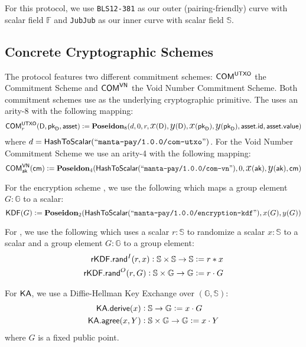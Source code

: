 For this protocol, we use \texttt{BLS12-381} as our outer (pairing-friendly) curve with scalar field $\mathbb{F}$ and \texttt{JubJub} as our inner curve with scalar field $\mathbb{S}$.

\subsection{Concrete Cryptographic Schemes}

\begin{definition}
    The protocol features two different commitment schemes: ${\textsf{COM}}^{{\textsf{UTXO}}}$ the \UTXO{} Commitment Scheme and ${\textsf{COM}}^{{\textsf{VN}}}$ the Void Number Commitment Scheme. Both commitment schemes use \Poseidon{} as the underlying cryptographic primitive. The \UTXO{} uses an arity-8 \Poseidon{} with the following mapping:
    \[{\textsf{COM}}^{{\textsf{UTXO}}}_r(\textsf{D}, {{\textsf{pk}}_\textsf{D}}, {\textsf{asset}}) := {\textbf{Poseidon}}_8(d, 0, r, {\text{\Large $x$}}(\textsf{D}), {\text{\Large $y$}}(\textsf{D}), {\text{\Large $x$}}({{\textsf{pk}}_\textsf{D}}), {\text{\Large $y$}}({{\textsf{pk}}_\textsf{D}}), {\textsf{asset}}.{\textsf{id}}, {\textsf{asset}}.{\textsf{value}})\]
    where $d = {\textsf{HashToScalar}}({``\texttt{manta-pay/1.0.0/com-utxo}"})$.
    For the Void Number Commitment Scheme we use an arity-4 \Poseidon{} with the following mapping:
    \[{\textsf{COM}}^{{\textsf{VN}}}_{\textsf{ak}}({\textsf{cm}}) := {\textbf{Poseidon}}_4({\textsf{HashToScalar}}({``\texttt{manta-pay/1.0.0/com-vn}"}), 0, {\text{\Large $x$}}({\textsf{ak}}), {\text{\Large $y$}}({\textsf{ak}}), {\textsf{cm}})\]
\end{definition}

\begin{definition}
    For the encryption scheme , we use the following which maps a group element $G : \mathbb{G}$ to a scalar:
    \[{\textsf{KDF}}(G) := {\textbf{Poseidon}}_2({\textsf{HashToScalar}}({``\texttt{manta-pay/1.0.0/encryption-kdf}"}), x(G), y(G))\]
\end{definition}

\begin{definition}
    For \rKDF, we use the following which uses a scalar $r: \mathbb{S}$ to randomize a scalar $x: \mathbb{S}$ to a scalar 
    and a group element $G : \mathbb{G}$ to a group element:
    \begin{align*}
        {\textsf{rKDF}}.{\textsf{rand}}^I(r, x): \mathbb{S} \times \mathbb{S} \to \mathbb{S} := r * x \\
        {\textsf{rKDF}}.{\textsf{rand}}^O(r, G): \mathbb{S} \times \mathbb{G} \to \mathbb{G} := r \cdot G
    \end{align*}

\end{definition}

\begin{definition}
    For ${\textsf{KA}}$, we use a Diffie-Hellman Key Exchange over $(\mathbb{G}, \mathbb{S})$:
    \begin{align*}
        {\textsf{KA}}.{\textsf{derive}}(x)   &: \mathbb{S} \to \mathbb{G}                   := x \cdot G \\
        {\textsf{KA}}.{\textsf{agree}}(x, Y) &: \mathbb{S} \times \mathbb{G} \to \mathbb{G} := x \cdot Y
    \end{align*}
    where $G$ is a fixed public point.
\end{definition}

